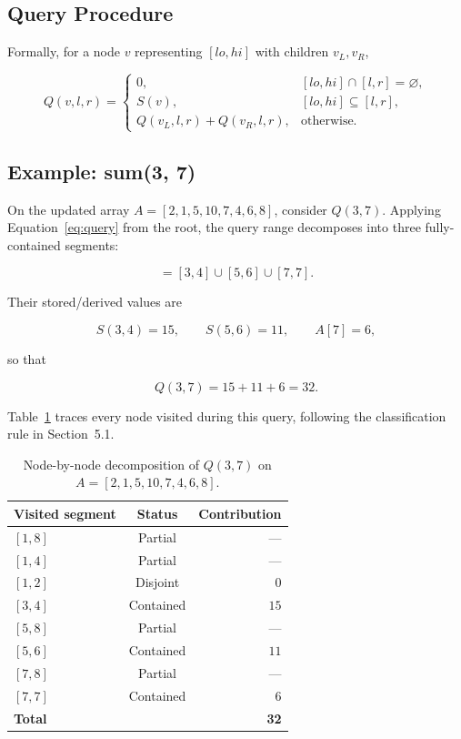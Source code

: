 \documentclass[11pt,open=any]{scrreprt}
\begin{document}
\subsection{Query Procedure}
Formally, for a node $v$ representing $[lo,hi]$ with children $v_L, v_R$,

\begin{equation}
Q(v,l,r) =
\begin{cases}
0, & [lo,hi] \cap [l,r] = \varnothing, \\[4pt]
S(v), & [lo,hi] \subseteq [l,r], \\[4pt]
Q(v_L,l,r) + Q(v_R,l,r), & \text{otherwise.}
\end{cases}
\label{eq:query}
\end{equation}

\subsection{Example: sum(3, 7)}
On the updated array $A = [2,1,5,10,7,4,6,8]$, consider $Q(3,7)$. Applying Equation~\eqref{eq:query} from the root, the query range decomposes into three fully-contained segments:

\begin{equation}
[3,7] = [3,4] \cup [5,6] \cup [7,7].
\end{equation}

Their stored/derived values are

\begin{equation}
S(3,4) = 15, \qquad S(5,6) = 11, \qquad A[7] = 6,
\end{equation}

so that

\begin{equation}
Q(3,7) = 15 + 11 + 6 = 32.
\end{equation}

Table~\ref{tab:decomp} traces every node visited during this query, following the classification rule in Section~5.1.

\begin{table}[h]
\centering
\caption{Node-by-node decomposition of $Q(3,7)$ on $A=[2,1,5,10,7,4,6,8]$.}
\label{tab:decomp}
\begin{tabular}{lcr}
\toprule
\textbf{Visited segment} & \textbf{Status} & \textbf{Contribution} \\
\midrule
$[1,8]$ & Partial   & --- \\
$[1,4]$ & Partial   & --- \\
$[1,2]$ & Disjoint  & $0$ \\
$[3,4]$ & Contained & $15$ \\
$[5,8]$ & Partial   & --- \\
$[5,6]$ & Contained & $11$ \\
$[7,8]$ & Partial   & --- \\
$[7,7]$ & Contained & $6$ \\
\midrule
\textbf{Total} & & \textbf{32} \\
\bottomrule
\end{tabular}
\end{table}
\end{document}
